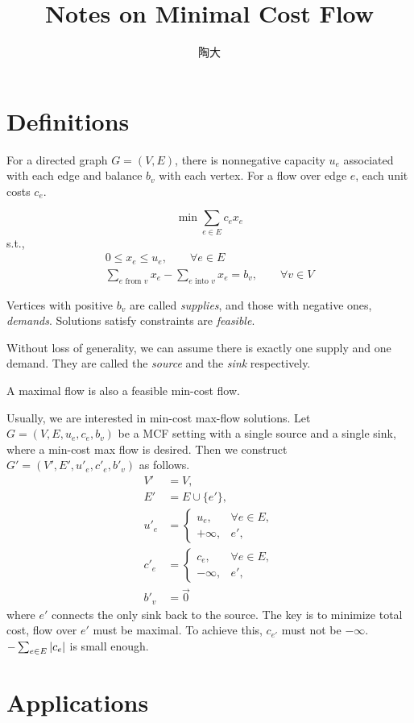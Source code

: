 \documentclass[UTF8,a4paper]{ctexart}
\title{Notes on Minimal Cost Flow}
\author{陶大}
\begin{document}
\maketitle
\tableofcontents

\section{Definitions}

For a directed graph $G=(V, E)$, there is nonnegative capacity $u_e$ associated with each edge
and balance $b_v$ with each vertex.
For a flow over edge $e$, each unit costs $c_e$.

\[
    \min \sum_{e\in E} c_e x_e
\]
s.t.,
\begin{align}
    0\leqslant x_e \leqslant u_e,\qquad \forall e\in E\\
    \sum_{e\text{ from }v} x_e - \sum_{e\text{ into }v} x_e = b_v,\qquad \forall v\in V
\end{align}

Vertices with positive $b_v$ are called \emph{supplies},
and those with negative ones, \emph{demands}.
Solutions satisfy constraints are \emph{feasible}.

Without loss of generality, we can assume there is exactly one supply and one demand.
They are called the \emph{source} and the \emph{sink} respectively.

\begin{lemma}
    A maximal flow is also a feasible min-cost flow.
\end{lemma}

\begin{remark}
    Usually, we are interested in min-cost max-flow solutions.
    Let $G=(V, E, {u_e}, {c_e}, {b_v})$ be a MCF setting with a single source and a single sink,
    where a min-cost max flow is desired.
    Then we construct $G'=(V', E', {u'_e}, {c'_e}, {b'_v})$ as follows.
    \begin{align}
        V'&=V,\\
        E'&=E\cup\{e'\},\\
        u'_e&=\begin{cases}
            u_e,&\forall e\in E,\\
            +\infty,&e',
        \end{cases}\\
        c'_e&=\begin{cases}
            c_e,&\forall e\in E,\\
            -\infty,&e',
        \end{cases}\\
        b'_v&=\vec{0}
    \end{align}
    where $e'$ connects the only sink back to the source.
    The key is to minimize total cost, flow over $e'$ must be maximal.
    To achieve this, $c_{e'}$ must not be $-\infty$.
    $-\sum_{e\in E}\left| c_e \right|$ is small enough.
\end{remark}

\section{Applications}
\end{document}
